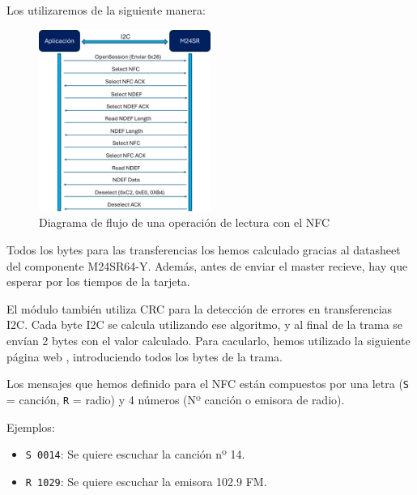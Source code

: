 Los utilizaremos de la siguiente manera:

\begin{figure}[h]
    \centering
    \includegraphics[width=0.5\textwidth]{images/3/3-2/SD/Diagrama.png}
    \caption{Diagrama de flujo de una operación de lectura con el NFC}
    \label{fig:label}
\end{figure}

Todos los bytes para las transferencias los hemos calculado gracias al datasheet del componente M24SR64-Y. Además, antes de enviar el master recieve, hay que esperar por los tiempos de la tarjeta.

El módulo también utiliza CRC para la detección de errores en transferencias I2C. Cada byte I2C se calcula utilizando ese algoritmo, y al final de la trama se envían 2 bytes con el valor calculado. Para cacularlo, hemos utilizado la siguiente página web \cite{CalculoCRC}, introduciendo todos los bytes de la trama.

Los mensajes que hemos definido para el NFC están compuestos por una letra (\texttt{S} = canción, \texttt{R} = radio) y 4 números (Nº canción o emisora de radio).

Ejemplos: 
\begin{itemize}
	\item \texttt{S 0014}: Se quiere escuchar la canción nº 14.
	\item \texttt{R 1029}: Se quiere escuchar la emisora 102.9 FM.
\end{itemize}